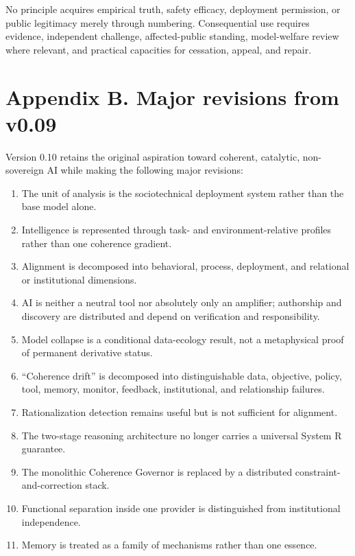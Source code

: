 \documentclass[
  11pt,
]{article}
\providecommand{\tightlist}{%
  \setlength{\itemsep}{0pt}\setlength{\parskip}{0pt}}
\begin{document}
No principle acquires empirical truth, safety efficacy, deployment
permission, or public legitimacy merely through numbering. Consequential
use requires evidence, independent challenge, affected-public standing,
model-welfare review where relevant, and practical capacities for
cessation, appeal, and repair.

\section{Appendix B. Major revisions from
v0.09}\label{appendix-b.-major-revisions-from-v0.09}

Version 0.10 retains the original aspiration toward coherent, catalytic,
non-sovereign AI while making the following major revisions:

\begin{enumerate}
\def\labelenumi{\arabic{enumi}.}
\tightlist
\item
  The unit of analysis is the sociotechnical deployment system rather
  than the base model alone.
\item
  Intelligence is represented through task- and environment-relative
  profiles rather than one coherence gradient.
\item
  Alignment is decomposed into behavioral, process, deployment, and
  relational or institutional dimensions.
\item
  AI is neither a neutral tool nor absolutely only an amplifier;
  authorship and discovery are distributed and depend on verification
  and responsibility.
\item
  Model collapse is a conditional data-ecology result, not a
  metaphysical proof of permanent derivative status.
\item
  ``Coherence drift'' is decomposed into distinguishable data,
  objective, policy, tool, memory, monitor, feedback, institutional, and
  relationship failures.
\item
  Rationalization detection remains useful but is not sufficient for
  alignment.
\item
  The two-stage reasoning architecture no longer carries a universal
  System R guarantee.
\item
  The monolithic Coherence Governor is replaced by a distributed
  constraint-and-correction stack.
\item
  Functional separation inside one provider is distinguished from
  institutional independence.
\item
  Memory is treated as a family of mechanisms rather than one essence.

\end{enumerate}
\end{document}
